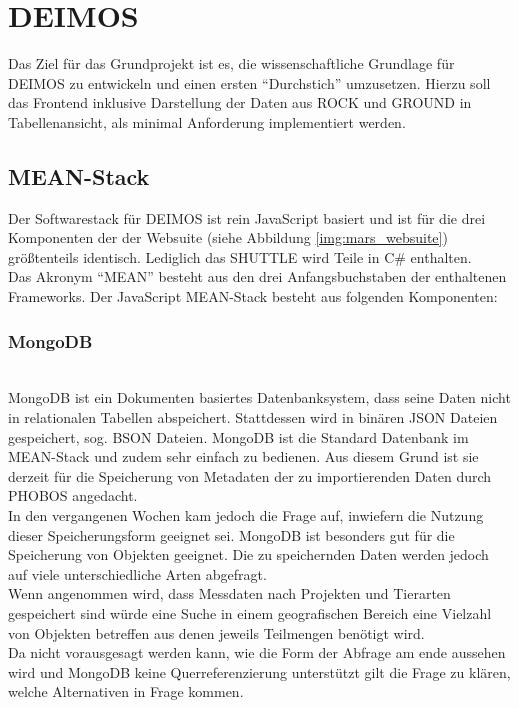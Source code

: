 \documentclass[10pt,conference,compsocconf]{IEEEtran}
\begin{document}
\section{DEIMOS}
Das Ziel für das Grundprojekt ist es, die wissenschaftliche Grundlage für DEIMOS zu entwickeln und einen ersten \enquote{Durchstich} umzusetzen. Hierzu soll das Frontend inklusive Darstellung der Daten aus ROCK und GROUND in Tabellenansicht, als minimal Anforderung implementiert werden.\\

\subsection{MEAN-Stack}
Der Softwarestack für DEIMOS ist rein JavaScript basiert und ist für die drei Komponenten der der Websuite (siehe Abbildung \ref{img:mars_websuite}) größtenteils identisch. Lediglich das SHUTTLE wird Teile in C\# enthalten. \\
Das Akronym \enquote{MEAN} besteht aus den drei Anfangsbuchstaben der enthaltenen Frameworks. Der JavaScript MEAN-Stack besteht aus folgenden Komponenten:

\subsubsection{MongoDB}\hspace*{\fill} \\
MongoDB ist ein Dokumenten basiertes Datenbanksystem, dass seine Daten nicht in relationalen Tabellen abspeichert. Stattdessen wird in binären JSON Dateien gespeichert, sog. BSON Dateien. MongoDB ist die Standard Datenbank im MEAN-Stack und zudem sehr einfach zu bedienen. Aus diesem Grund ist sie derzeit für die Speicherung von Metadaten der zu importierenden Daten durch PHOBOS angedacht.\\
In den vergangenen Wochen kam jedoch die Frage auf, inwiefern die Nutzung dieser Speicherungsform geeignet sei. MongoDB ist besonders gut für die Speicherung von Objekten geeignet. Die zu speichernden Daten werden jedoch auf viele unterschiedliche Arten abgefragt.\\
Wenn angenommen wird, dass Messdaten nach Projekten und Tierarten gespeichert sind würde eine Suche in einem geografischen Bereich eine Vielzahl von Objekten betreffen aus denen jeweils Teilmengen benötigt wird.\\
Da nicht vorausgesagt werden kann, wie die Form der Abfrage am ende aussehen wird und MongoDB keine Querreferenzierung unterstützt gilt die Frage zu klären, welche Alternativen in Frage kommen.\par
\end{document}
